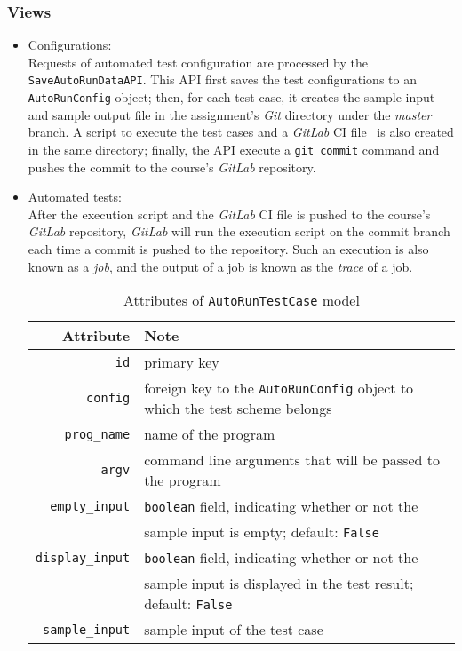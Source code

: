 \subsubsection{Views}
\begin{itemize}
    \item Configurations: \\
    Requests of automated test configuration are processed by the
    \texttt{Save\-Auto\-Run\-Data\-API}.
    This API first saves the test configurations to an \texttt{AutoRunConfig}
    object;
    then, for each test case, it creates the sample input and sample output
    file in the assignment's \emph{Git} directory under the \emph{master}
    branch.
    A script to execute the test cases and a \emph{GitLab} CI
    file~\cite{gitlabConfig} is also created in the same directory;
    finally, the API execute a \texttt{git commit} command and pushes the
    commit to the course's \emph{GitLab} repository.

    \item Automated tests: \\
    After the execution script and the \emph{GitLab} CI file is pushed to the
    course's \emph{GitLab} repository, \emph{GitLab} will run the execution
    script on the commit branch each time a commit is pushed to the repository.
    Such an execution is also known as a \emph{job}, and the output of a job
    is known as the \emph{trace} of a job.

\begin{table}[H]
    \centering
    \caption{Attributes of \texttt{AutoRunTestCase} model}
    \label{tab:TC_ATTR}
    \renewcommand{\arraystretch}{1}
    \begin{tabular}[h]{r|p{4in}}
        \hline
        Attribute & Note \\
        \hline
        \hline

        \texttt{id} & primary key \\
        \hline
        \texttt{config} & foreign key to the \texttt{AutoRunConfig} object to
            which the  test scheme belongs \\
        \hline
        \hline

        \texttt{prog\_name} & name of the program \\
        \hline
        \texttt{argv} & command line arguments that will be passed to the  program \\
        \hline
        \hline

        \texttt{empty\_input} & \texttt{boolean} field, indicating whether or not the \\
            & sample input is empty;  default: \texttt{False} \\
        \hline
        \texttt{display\_input} & \texttt{boolean} field, indicating whether or not the \\
            & sample input is displayed in the test result;  default: \texttt{False} \\
        \hline
        \texttt{sample\_input} & sample input of the test case \\
        \hline
        \hline


\end{tabular}
\end{table}
\end{itemize}

